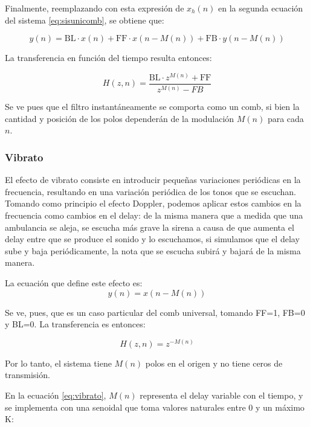 \documentclass[assd_tp2_main.tex]{subfiles}
\begin{document}
Finalmente, reemplazando con esta expresi\'on de $x_h(n)$  en la segunda ecuaci\'on del sistema \ref{eq:sisunicomb}, se obtiene que:

\begin{equation}
	y(n) = \text{BL} \cdot x(n) + 
	\text{FF} \cdot x(n-M(n)) + \text{FB} \cdot y(n-M(n)) 
\end{equation}

La transferencia en funci\'on del tiempo resulta entonces:

\begin{equation}
	H(z, n) = \frac{\text{BL} \cdot z^{M(n)} +  \text{FF} }{z^{M(n)} - FB}
	\label{eq:tz-combuniv}
\end{equation}

Se ve pues que el filtro instant\'aneamente se comporta como un comb, si bien la cantidad y posici\'on de los polos depender\'an de la modulaci\'on $M(n)$ para cada $n$.


\subsubsection{Vibrato}

El efecto de vibrato consiste en introducir peque\~nas variaciones peri\'odicas en la frecuencia, resultando en una variaci\'on peri\'odica de los tonos que se escuchan. Tomando como principio el efecto Doppler, podemos aplicar estos cambios en la frecuencia como cambios en el delay: de la misma manera que a medida que una ambulancia se aleja, se escucha m\'as grave la sirena a causa de que aumenta el delay entre que se produce el sonido y lo escuchamos, si simulamos que el delay sube y baja peri\'odicamente, la nota que se escucha subir\'a y bajar\'a de la misma manera.

La ecuaci\'on que define este efecto es:
\begin{equation}
	y(n) = x\left(n - M(n) \right)
	\label{eq:vibrato}
\end{equation}

Se ve, pues, que es un caso particular del comb universal, tomando FF=1, FB=0 y BL=0. La transferencia es entonces:

\begin{equation}
	H(z,n) = z^{-M(n)}
\end{equation}

Por lo tanto, el sistema tiene $M(n)$ polos en el origen y no tiene ceros de transmisi\'on.

En la ecuaci\'on \ref{eq:vibrato}, $M(n)$ representa el delay variable con el tiempo, y se implementa con una senoidal que toma valores naturales entre 0 y un m\'aximo K:
\end{document}

